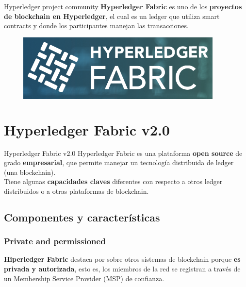 \documentclass{beamer}
\begin{document}
	\begin{frame}
		\begin{block}{Hyperledger project community}
			\textbf{Hyperledger Fabric} es uno de los \textbf{proyectos de blockchain en Hyperledger}, el cual es un ledger que utiliza smart contracts y donde los participantes manejan las transacciones.
			\begin{figure}[h]
				\includegraphics[scale=.3]{fabric_logo}
				\centering
			\end{figure}
		\end{block}
	\end{frame}
	
	\section{Hyperledger Fabric v2.0}
	
	\begin{frame}
		\begin{block}{Hyperledger Fabric v2.0}
			Hyperledger Fabric es una plataforma \textbf{open source} de grado \textbf{empresarial}, que permite manejar un tecnología distribuida de ledger (una blockchain).\\
			\vspace{4mm}
			Tiene algunas \textbf{capacidades claves} diferentes con respecto a otros ledger distribuidos o a otras plataformas de blockchain.
		\end{block}
	\end{frame}

	\subsection{Componentes y características}
	
	\begin{frame}
		\frametitle{Private and permissioned}
		\textbf{Hiperledger Fabric} destaca por sobre otros sistemas de blockchain porque \textbf{es privada y autorizada}, esto es, los miembros de la red se registran a través de un Membership Service Provider (MSP) de confianza.\\
	\end{frame}
\end{document}
